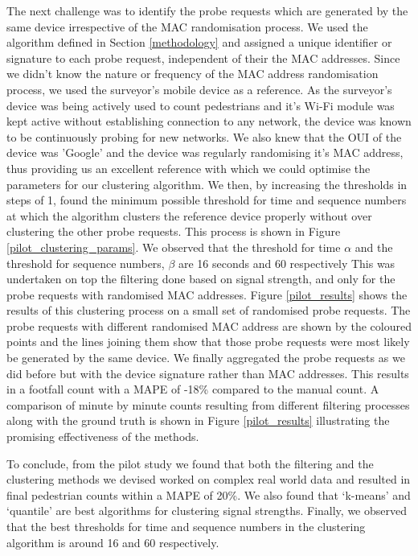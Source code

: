 The next challenge was to identify the probe requests which are generated by
the same device irrespective of the MAC randomisation process. We used the
algorithm defined in Section \ref{methodology} and assigned a unique identifier
or signature to each probe request, independent of their the MAC addresses.
Since we didn't know the nature or frequency of the MAC address randomisation
process, we used the surveyor's mobile device as a reference. As the surveyor's
device was being actively used to count pedestrians and it's Wi-Fi module was
kept active without establishing connection to any network, the device was
known to be continuously probing for new networks. We also knew that the OUI of
the device was 'Google' and the device was regularly randomising it's MAC
address, thus providing us an excellent reference with which we could optimise
the parameters for our clustering algorithm. We then, by increasing the
thresholds in steps of 1, found the minimum possible threshold for time and
sequence numbers at which the algorithm clusters the reference device properly
without over clustering the other probe requests.  This process is shown in
Figure \ref{pilot_clustering_params}. We observed that the threshold for time
$\alpha$ and the threshold for sequence numbers, $\beta$ are 16 seconds and 60
respectively This was undertaken on top the filtering done based on signal
strength, and only for the probe requests with randomised MAC addresses. Figure
\ref{pilot_results} shows the results of this clustering process on a small set
of randomised probe requests. The probe requests with different randomised MAC
address are shown by the coloured points and the lines joining them show that
those probe requests were most likely be generated by the same device. We
finally aggregated the probe requests as we did before but with the device
signature rather than MAC addresses. This results in a footfall count with a
MAPE of -18\% compared to the manual count. A comparison of minute by minute
counts resulting from different filtering processes along with the ground truth
is shown in Figure \ref{pilot_results} illustrating the promising effectiveness
of the methods.

To conclude, from the pilot study we found that both the filtering and the
clustering methods we devised worked on complex real world data and resulted in
final pedestrian counts within a MAPE of 20\%. We also found that `k-means' and
`quantile' are best algorithms for clustering signal strengths. Finally, we
observed that the best thresholds for time and sequence numbers in the
clustering algorithm is around 16 and 60 respectively.
